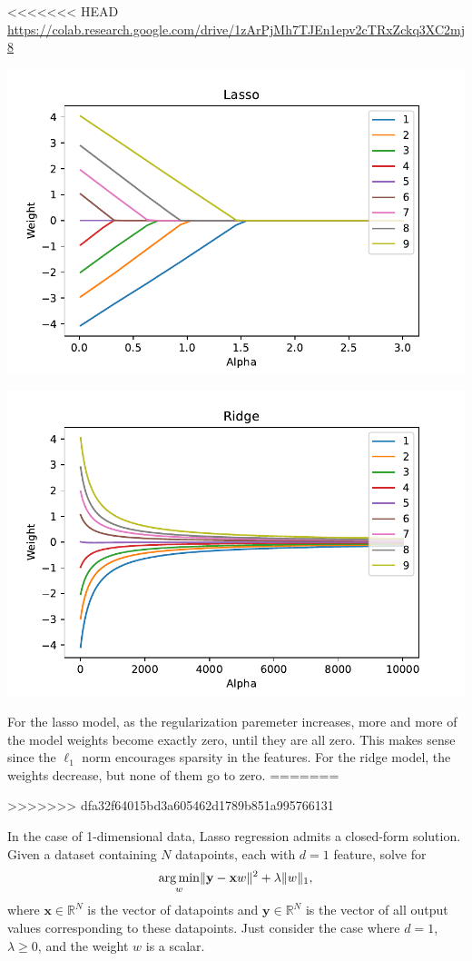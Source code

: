 \begin{solution}
<<<<<<< HEAD
  \url{https://colab.research.google.com/drive/1zArPjMh7TJEn1epv2cTRxZckq3XC2mj8}
  \begin{center}
    \includegraphics[width=.7\textwidth]{lasso.pdf}
  \end{center}

  \begin{center}
    \includegraphics[width=.7\textwidth]{ridge2.pdf}
  \end{center}
  For the lasso model, as the regularization paremeter increases, more and more of the model weights become exactly zero, until they are all zero. This makes sense since the $\ell_1$ norm encourages sparsity in the features. For the ridge model, the weights decrease, but none of them go to zero.
=======

>>>>>>> dfa32f64015bd3a605462d1789b851a995766131
\end{solution}

\problem[9]

\subproblem
In the case of 1-dimensional data, Lasso regression admits a closed-form solution.
Given a dataset containing $N$ datapoints, each with $d = 1$ feature, solve for
\[\underset{w}{\operatorname{arg\,min}} \Vert\mathbf{y} - \mathbf{x}w\Vert^2 + \lambda\Vert w\Vert_1,
\]
where $\mathbf{x} \in \mathbb{R}^{N}$ is the vector of datapoints and $\mathbf{y} \in \mathbb{R}^N$ is the  vector of all output values corresponding to these datapoints. Just consider the case where $d = 1$, $\lambda \geq 0$, and the weight $w$ is a scalar.

